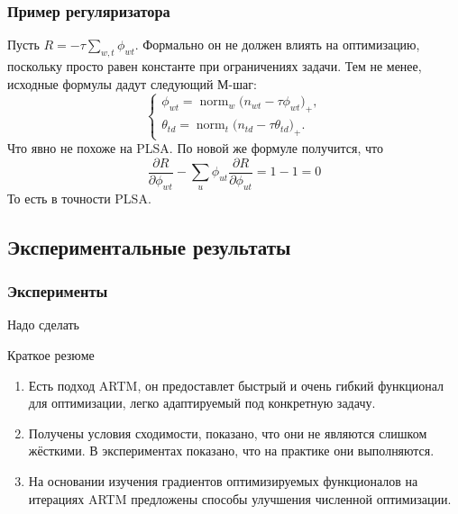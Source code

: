\documentclass[utf8]{beamer}
\DeclareMathOperator{\norm}{norm}
\begin{document}
\begin{frame}
		\frametitle{Пример регуляризатора}
Пусть $R = -\tau \sum\limits_{w, t} \phi_{wt}$. Формально он не должен влиять на оптимизацию, поскольку просто равен константе при ограничениях задачи. Тем не менее, исходные формулы дадут следующий М-шаг:
\[
\left\{
	\begin{aligned}
		\phi_{wt} = \norm_w \bigg( n_{wt} - \tau \phi_{wt}\bigg)_{+},\\
		\theta_{td} = \norm_t \bigg( n_{td} - \tau \theta_{td}\bigg)_{+}.
	\end{aligned}
\right.
\]
Что явно не похоже на PLSA. По новой же формуле получится, что 
\[
\frac{\partial{R}}{\partial{\phi_{wt}}} - \sum\limits_u \phi_{ut} \frac{\partial{R}}{\partial{\phi_{ut}}} = 1- 1 =0
\]
То есть в точности PLSA.
	\end{frame}

	\subsection{Экспериментальные результаты}
	
	\begin{frame}
		\frametitle{Эксперименты}
		Надо сделать
	\end{frame}

	\begin{frame}{Краткое резюме}
 \begin{enumerate}
\item Есть подход ARTM, он предоставлет быстрый и очень гибкий функционал для оптимизации, легко адаптируемый под конкретную задачу.
\item Получены условия сходимости, показано, что они не являются слишком жёсткими. В экспериментах показано, что на практике они выполняются.
\item На основании изучения градиентов оптимизируемых функционалов на итерациях ARTM предложены способы улучшения численной оптимизации.
\end{enumerate}
	\end{frame}
\end{document}
